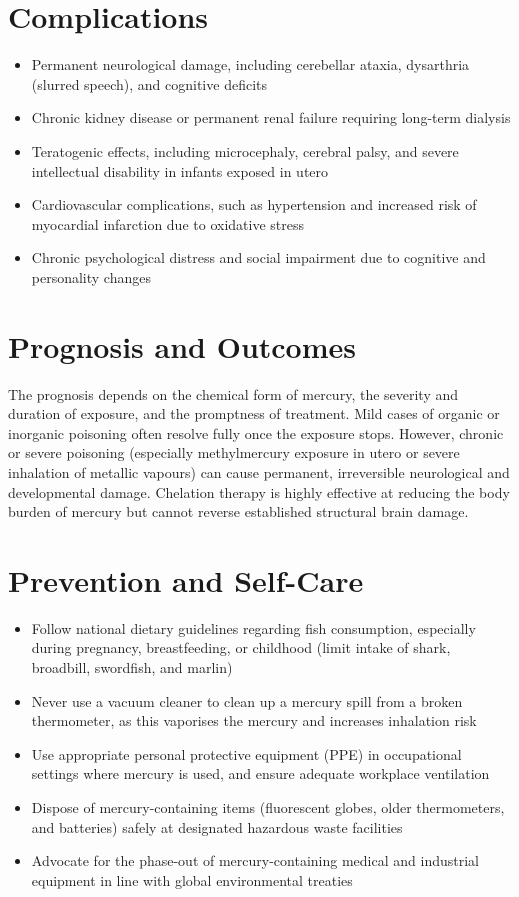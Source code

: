 \section*{Complications}
\begin{itemize}
    \item Permanent neurological damage, including cerebellar ataxia, dysarthria (slurred speech), and cognitive deficits
    \item Chronic kidney disease or permanent renal failure requiring long-term dialysis
    \item Teratogenic effects, including microcephaly, cerebral palsy, and severe intellectual disability in infants exposed in utero
    \item Cardiovascular complications, such as hypertension and increased risk of myocardial infarction due to oxidative stress
    \item Chronic psychological distress and social impairment due to cognitive and personality changes
\end{itemize}

\section*{Prognosis and Outcomes}
The prognosis depends on the chemical form of mercury, the severity and duration of exposure, and the promptness of treatment. Mild cases of organic or inorganic poisoning often resolve fully once the exposure stops. However, chronic or severe poisoning (especially methylmercury exposure in utero or severe inhalation of metallic vapours) can cause permanent, irreversible neurological and developmental damage. Chelation therapy is highly effective at reducing the body burden of mercury but cannot reverse established structural brain damage.

\section*{Prevention and Self-Care}
\begin{itemize}
    \item Follow national dietary guidelines regarding fish consumption, especially during pregnancy, breastfeeding, or childhood (limit intake of shark, broadbill, swordfish, and marlin)
    \item Never use a vacuum cleaner to clean up a mercury spill from a broken thermometer, as this vaporises the mercury and increases inhalation risk
    \item Use appropriate personal protective equipment (PPE) in occupational settings where mercury is used, and ensure adequate workplace ventilation
    \item Dispose of mercury-containing items (fluorescent globes, older thermometers, and batteries) safely at designated hazardous waste facilities
    \item Advocate for the phase-out of mercury-containing medical and industrial equipment in line with global environmental treaties
\end{itemize}

